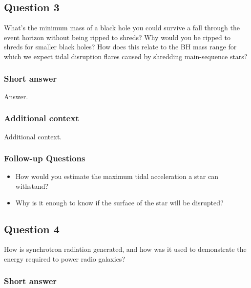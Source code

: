 \documentclass[a4paper,10pt]{article}
\begin{document}
\newpage
\subsection{Question 3}

What's the minimum mass of a black hole you could survive a fall through the event horizon without being ripped to shreds? Why would you be ripped to shreds for smaller black holes? How does this relate to the BH mass range for which we expect tidal disruption flares caused by shredding main-sequence stars?

\subsubsection{Short answer}

Answer.

\subsubsection{Additional context}

Additional context.

\subsubsection{Follow-up Questions}

\begin{itemize}
    \item How would you estimate the maximum tidal acceleration a star can withstand?
    \item Why is it enough to know if the surface of the star will be disrupted?
\end{itemize}


\newpage
\subsection{Question 4}

How is synchrotron radiation generated, and how was it used to demonstrate the energy required to power radio galaxies?

\subsubsection{Short answer}
\end{document}
